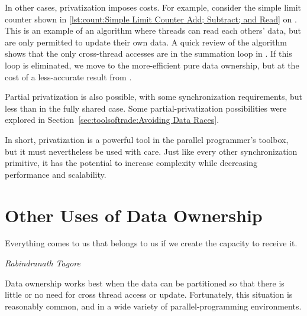 In other cases, privatization imposes costs.
For example, consider the simple limit counter shown in
\cref{lst:count:Simple Limit Counter Add; Subtract; and Read} on
.
This is an example of an algorithm where threads can read each others'
data, but are only permitted to update their own data.
A quick review of the algorithm shows that the only cross-thread
accesses are in the summation loop in .
If this loop is eliminated, we move to the more-efficient pure
data ownership, but at the cost of a less-accurate result
from .

\QuickQuizEnd

Partial privatization is also possible, with some synchronization
requirements, but less than in the fully shared case.
Some partial-privatization possibilities were explored in
Section~\ref{sec:toolsoftrade:Avoiding Data Races}.

In short, privatization is a powerful tool in the parallel programmer's
toolbox, but it must nevertheless be used with care.
Just like every other synchronization primitive, it has the potential
to increase complexity while decreasing performance and scalability.

\section{Other Uses of Data Ownership}
\label{sec:owned:Other Uses of Data Ownership}
%
\epigraph{Everything comes to us that belongs to us if we create the
	  capacity to receive it.}
	 {\emph{Rabindranath Tagore}}

Data ownership works best when the data can be partitioned so that there
is little or no need for cross thread access or update.
Fortunately, this situation is reasonably common, and in a wide variety
of parallel-programming environments.

